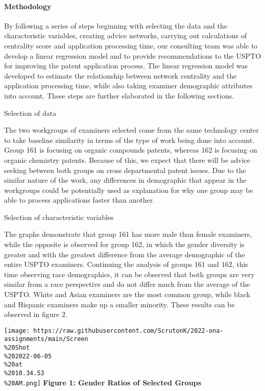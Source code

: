 \documentclass[
]{article}
\begin{document}
\hypertarget{methodology}{%
\paragraph{Methodology}\label{methodology}}

By following a series of steps beginning with selecting the data and the
characteristic variables, creating advice networks, carrying out
calculations of centrality score and application processing time, our
consulting team was able to develop a linear regression model and to
provide recommendations to the USPTO for improving the patent
application process. The linear regression model was developed to
estimate the relationship between network centrality and the application
processing time, while also taking examiner demographic attributes into
account. These steps are further elaborated in the following sections.

Selection of data

The two workgroups of examiners selected come from the same technology
center to take baseline similarity in terms of the type of work being
done into account. Group 161 is focusing on organic compounds patents,
whereas 162 is focusing on organic chemistry patents. Because of this,
we expect that there will be advice seeking between both groups on cross
departmental patent issues. Due to the similar nature of the work, any
differences in demographic that appear in the workgroups could be
potentially used as explanation for why one group may be able to process
applications faster than another.

Selection of characteristic variables

The graphs demonstrate that group 161 has more male than female
examiners, while the opposite is observed for group 162, in which the
gender diversity is greater and with the greatest difference from the
average demographic of the entire USPTO examiners. Continuing the
analysis of groups 161 and 162, this time observing race demographics,
it can be observed that both groups are very similar from a race
perspective and do not differ much from the average of the USPTO. White
and Asian examiners are the most common group, while black and Hispanic
examiners make up a smaller minority. These results can be observed in
figure 2.

\texttt{[image: https://raw.githubusercontent.com/ScrutonK/2022-ona-assignments/main/Screen\\\%20Shot\\\%202022-06-05\\\%20at\\\%2010.34.53\\\%20AM.png]}
\textbf{Figure 1: Gender Ratios of Selected Groups}
\end{document}
